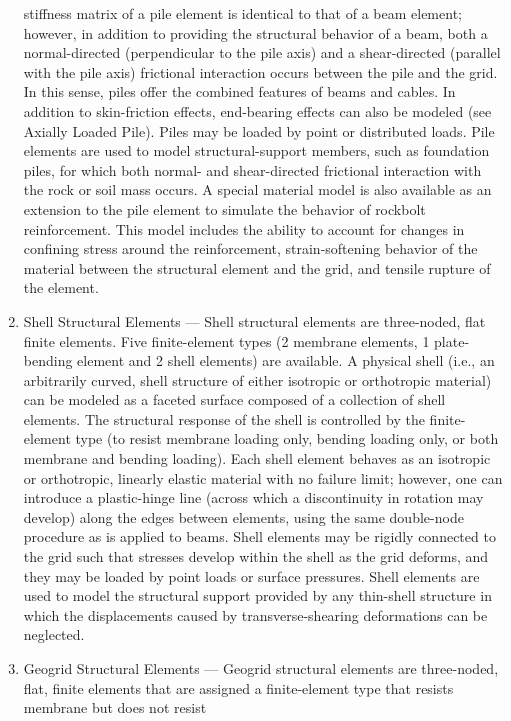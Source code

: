 \documentclass[a4paper, nobind]{templates/ociamthesis}
\begin{document}
\begin{enumerate}
  stiffness matrix of a pile element is identical to that of a beam
  element; however, in addition to providing the structural behavior
  of a beam, both a normal-directed (perpendicular to the pile axis)
  and a shear-directed (parallel with the pile axis) frictional
  interaction occurs between the pile and the grid. In this sense,
  piles offer the combined features of beams and cables. In addition
  to skin-friction effects, end-bearing effects can also be modeled
  (see Axially Loaded Pile). Piles may be loaded by point or
  distributed loads. Pile elements are used to model
  structural-support members, such as foundation piles, for which both
  normal- and shear-directed frictional interaction with the rock or
  soil mass occurs. A special material model is also available as an
  extension to the pile element to simulate the behavior of rockbolt
  reinforcement. This model includes the ability to account for
  changes in confining stress around the reinforcement,
  strain-softening behavior of the material between the structural
  element and the grid, and tensile rupture of the element.
\item
  Shell Structural Elements --- Shell structural elements are
  three-noded, flat finite elements. Five finite-element types (2
  membrane elements, 1 plate-bending element and 2 shell elements) are
  available. A physical shell (i.e., an arbitrarily curved, shell
  structure of either isotropic or orthotropic material) can be
  modeled as a faceted surface composed of a collection of shell
  elements. The structural response of the shell is controlled by the
  finite-element type (to resist membrane loading only, bending
  loading only, or both membrane and bending loading). Each shell
  element behaves as an isotropic or orthotropic, linearly elastic
  material with no failure limit; however, one can introduce a
  plastic-hinge line (across which a discontinuity in rotation may
  develop) along the edges between elements, using the same
  double-node procedure as is applied to beams. Shell elements may be
  rigidly connected to the grid such that stresses develop within the
  shell as the grid deforms, and they may be loaded by point loads or
  surface pressures. Shell elements are used to model the structural
  support provided by any thin-shell structure in which the
  displacements caused by transverse-shearing deformations can be
  neglected.
\item
  Geogrid Structural Elements --- Geogrid structural elements are
  three-noded, flat, finite elements that are assigned a
  finite-element type that resists membrane but does not resist

\end{enumerate}
\end{document}
